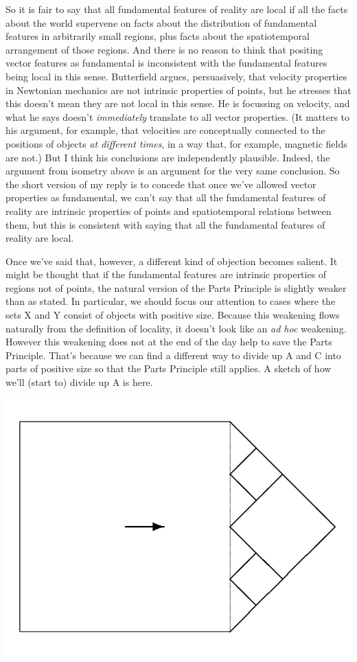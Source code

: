\documentclass[
  10pt,
  letterpaper,
  DIV=11,
  numbers=noendperiod,
  twoside]{scrartcl}
\begin{document}
So it is fair to say that all fundamental features of reality are local
if all the facts about the world supervene on facts about the
distribution of fundamental features in arbitrarily small regions, plus
facts about the spatiotemporal arrangement of those regions. And there
is no reason to think that positing vector features as fundamental is
inconsistent with the fundamental features being local in this sense.
Butterfield argues, persuasively, that velocity properties in Newtonian
mechanics are not intrinsic properties of points, but he stresses that
this doesn't mean they are not local in this sense. He is focussing on
velocity, and what he says doesn't \emph{immediately} translate to all
vector properties. (It matters to his argument, for example, that
velocities are conceptually connected to the positions of objects
\emph{at different times}, in a way that, for example, magnetic fields
are not.) But I think his conclusions are independently plausible.
Indeed, the argument from isometry above is an argument for the very
same conclusion. So the short version of my reply is to concede that
once we've allowed vector properties as fundamental, we can't say that
all the fundamental features of reality are intrinsic properties of
points and spatiotemporal relations between them, but this is consistent
with saying that all the fundamental features of reality are local.

Once we've said that, however, a different kind of objection becomes
salient. It might be thought that if the fundamental features are
intrinsic properties of regions not of points, the natural version of
the Parts Principle is slightly weaker than as stated. In particular, we
should focus our attention to cases where the sets X and Y consist of
objects with positive size. Because this weakening flows naturally from
the definition of locality, it doesn't look like an \emph{ad hoc}
weakening. However this weakening does not at the end of the day help to
save the Parts Principle. That's because we can find a different way to
divide up A and C into parts of positive size so that the Parts
Principle still applies. A sketch of how we'll (start to) divide up A is
here.

\includegraphics{images/amp_3.png}
\end{document}
